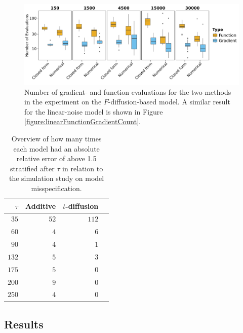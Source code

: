 \begin{figure}[h!]
    \begin{center}
    \includegraphics[scale = .08]{figures/function_gradient_count_F_plot.jpeg}     
    \caption{Number of gradient- and function evaluations for the two methods in the experiment on the $F$-diffusion-based model. A similar result for the linear-noise model is shown in Figure \ref{figure:linearFunctionGradientCount}.}
    \label{figure:FFunctionGradientCount}   
    \end{center}
\end{figure}
\begin{table}[h!]
    \centering
    \begin{tabular}{rrrr}
    $\tau$ & Additive & $t$-diffusion \\ 
      \hline
      $35$ &  $52$ & $112$ \\ 
      $60$ &   $4$ & $6$ \\ 
      $90$ &   $4$ & $1$ \\ 
      $132$ &  $5$ & $3$ \\ 
      $175$ &  $5$ & $0$ \\ 
      $200$ &  $9$ & $0$ \\ 
      $250$ &  $4$ & $0$ \\ 
       \hline
    \end{tabular}
    \caption{Overview of how many times each model had an absolute relative error of above 1.5 stratified after $\tau$ in relation to the simulation study on model misspecification.}
    \label{table:AREabove1.5tauSim}
    \end{table}
\newpage
\subsection{Results}
